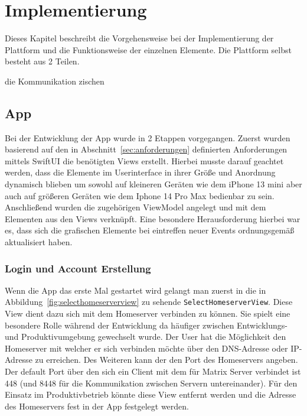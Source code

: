     \newpage
    \chapter{Implementierung}\label{ch:implementierung}
    Dieses Kapitel beschreibt die Vorgehensweise bei der Implementierung der Plattform und die Funktionsweise der einzelnen Elemente.
    Die Plattform selbst besteht aus 2 Teilen.

    die Kommunikation zischen



    \section{App}\label{sec:app}
    Bei der Entwicklung der App wurde in 2 Etappen vorgegangen.
    Zuerst wurden basierend auf den in Abschnitt~\ref{sec:anforderungen} definierten Anforderungen mittels SwiftUI die benötigten Views erstellt.
    Hierbei musste darauf geachtet werden, dass die Elemente im Userinterface in ihrer Größe und Anordnung dynamisch blieben um sowohl auf kleineren Geräten wie dem iPhone 13 mini aber auch auf größeren Geräten wie dem Iphone 14 Pro Max bedienbar zu sein.
    Anschließend wurden die zugehörigen ViewModel angelegt und mit dem Elementen aus den Views verknüpft.
    Eine besondere Herausforderung hierbei war es, dass sich die grafischen Elemente bei eintreffen neuer Events ordnungsgemäß aktualisiert haben.


    \newpage
    \subsection{Login und Account Erstellung}\label{subsec:login-und-account-erstellung}

    Wenn die App das erste Mal gestartet wird gelangt man zuerst in die in Abbildung~\ref{fig:selecthomeserverview} zu sehende \texttt{SelectHomeserverView}.
    Diese View dient dazu sich mit dem Homeserver verbinden zu können.
    Sie spielt eine besondere Rolle während der Entwicklung da häufiger zwischen Entwicklungs- und Produktivumgebung gewechselt wurde.
    Der User hat die Möglichkeit den Homeserver mit welcher er sich verbinden möchte über den DNS-Adresse oder IP-Adresse zu erreichen.
    Des Weiteren kann der den Port des Homeservers angeben.
    Der default Port über den sich ein Client mit dem für Matrix Server verbindet ist 448 (und 8448 für die Kommunikation zwischen Servern untereinander).
    Für den Einsatz im Produktivbetrieb könnte diese View entfernt werden und die Adresse des Homeservers fest in der App festgelegt werden.

